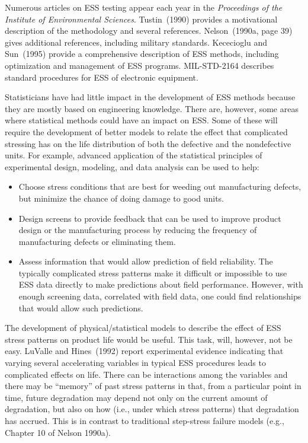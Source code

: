 Numerous articles on ESS testing appear each year in the {\em
Proceedings of the Institute of Environmental Sciences}.
Tustin~(1990) provides a motivational description of the methodology
and several references.  Nelson~(1990a, page 39) gives additional
references, including military standards.  Kececioglu and Sun~(1995)
provide a comprehensive description of ESS methods, including
optimization and management of ESS programs. MIL-STD-2164
describes standard procedures for ESS of electronic equipment.

Statisticians have had little impact in the development of ESS
methods because they are mostly based on engineering
knowledge. There are, however, some areas where statistical methods
could have an impact on ESS. Some of these will require the
development of better models to relate the effect that complicated
stressing has on the life distribution of both the defective and the
nondefective units.  For example, advanced application of the
statistical principles of experimental design, modeling, and data
analysis can be used to help:
\begin{itemize}
\item
Choose stress conditions that are best for weeding out manufacturing
defects, but minimize the chance of doing damage to good units.
\item
Design screens to provide feedback that can be used to improve
product design or the manufacturing process by reducing the frequency of
manufacturing defects or eliminating them.
\item
Assess information that would allow prediction of field reliability.
The typically complicated stress patterns make it difficult or
impossible to use ESS data directly to make predictions about field
performance.  However, with enough screening data, correlated with
field data, one could find relationships that would allow such
predictions.
\end{itemize}
The development of physical/statistical models to describe the
effect of ESS stress patterns on product life would be useful.  This
task, will, however, not be easy.  LuValle and Hines~(1992) report
experimental evidence indicating that varying several accelerating
variables in typical ESS procedures leads to complicated effects on
life.  There can be interactions among the variables and there may
be ``memory'' of past stress patterns in that, from a particular
point in time, future degradation may depend not only on the current
amount of degradation, but also on how (i.e., under which stress
patterns) that degradation has accrued.  This is in contrast to
traditional step-stress failure models (e.g., Chapter 10 of Nelson
1990a).

